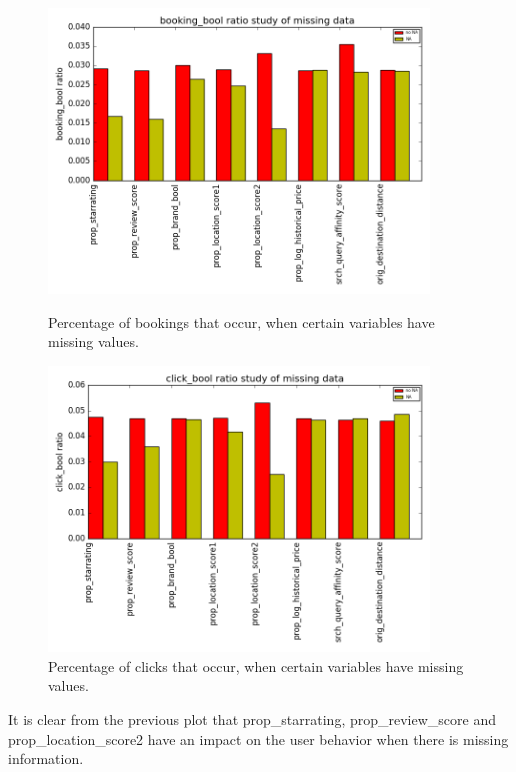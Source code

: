 \documentclass[9pt]{llncs}
\begin{document}
\begin{figure}[h]
     \centering
     \begin{minipage}{0.45\textwidth}
     \centering
     \includegraphics[width=0.9\textwidth]{missing_info_booking_bool_ratio.png}
         \caption{Percentage of bookings that occur, when certain variables have missing values. }
         \label{mp_1a}
     \end{minipage}\hfill
     \begin{minipage}{0.45\textwidth}
         \centering
         \includegraphics[width=0.9\textwidth]{missing_info_click_bool_ratio.png}
         \caption{Percentage of clicks that occur, when certain variables have missing values.}
         \label{mp_1b}
     \end{minipage}
\end{figure}


It is clear from the previous plot that prop\_starrating, prop\_review\_score and prop\_location\_score2 have an impact on the user behavior when there is missing information.
\end{document}
